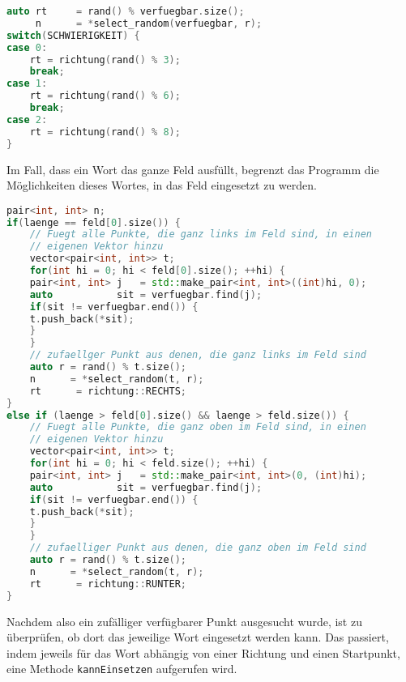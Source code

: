 \documentclass[a4paper,10pt,ngerman]{scrartcl}
\begin{document}
\begin{lstlisting}[language=C++]
auto rt     = rand() % verfuegbar.size();
     n      = *select_random(verfuegbar, r);
switch(SCHWIERIGKEIT) {
case 0:
    rt = richtung(rand() % 3);
    break;
case 1:
    rt = richtung(rand() % 6);
    break;
case 2:
    rt = richtung(rand() % 8);
}
\end{lstlisting}

Im Fall, dass ein Wort das ganze Feld ausfüllt, begrenzt das Programm die Möglichkeiten dieses Wortes, in das Feld eingesetzt zu werden.

\begin{lstlisting}[language=C++]
pair<int, int> n;
if(laenge == feld[0].size()) {
	// Fuegt alle Punkte, die ganz links im Feld sind, in einen
	// eigenen Vektor hinzu
	vector<pair<int, int>> t;
	for(int hi = 0; hi < feld[0].size(); ++hi) {
	pair<int, int> j   = std::make_pair<int, int>((int)hi, 0);
	auto           sit = verfuegbar.find(j);
	if(sit != verfuegbar.end()) {
	t.push_back(*sit);
	}
	}
	// zufaellger Punkt aus denen, die ganz links im Feld sind
	auto r = rand() % t.size();
	n      = *select_random(t, r);
	rt      = richtung::RECHTS;
}
else if (laenge > feld[0].size() && laenge > feld.size()) {
	// Fuegt alle Punkte, die ganz oben im Feld sind, in einen
	// eigenen Vektor hinzu
	vector<pair<int, int>> t;
	for(int hi = 0; hi < feld.size(); ++hi) {
	pair<int, int> j   = std::make_pair<int, int>(0, (int)hi);
	auto           sit = verfuegbar.find(j);
	if(sit != verfuegbar.end()) {
	t.push_back(*sit);
	}
	}
	// zufaelliger Punkt aus denen, die ganz oben im Feld sind
	auto r = rand() % t.size();
	n      = *select_random(t, r);
	rt      = richtung::RUNTER;
}
\end{lstlisting}

Nachdem also ein zufälliger verfügbarer Punkt ausgesucht wurde, ist zu überprüfen, ob dort das jeweilige Wort 
eingesetzt werden kann. Das passiert, indem jeweils für das Wort abhängig von einer Richtung und einen 
Startpunkt, eine Methode \lstinline{kannEinsetzen} aufgerufen wird.
\end{document}
